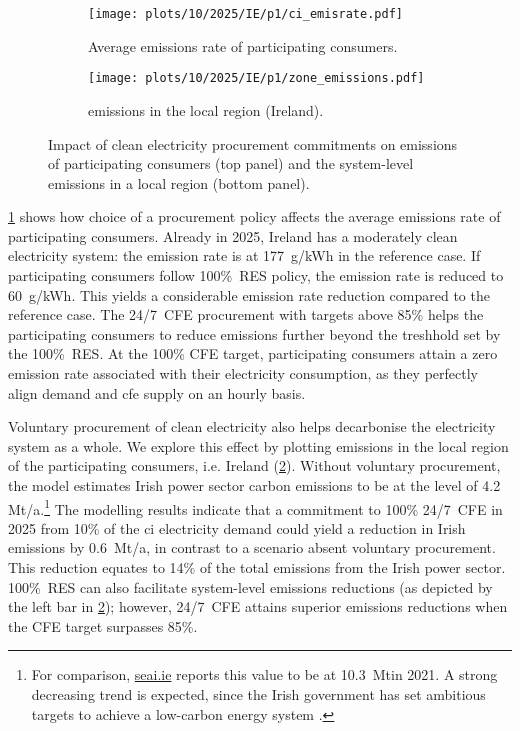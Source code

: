 \begin{figure}[t]
    \centering
    \begin{subfigure}[t]{0.95\columnwidth}
        \centering
        \caption{Average emissions rate of participating consumers.}
        \texttt{[image: plots/10/2025/IE/p1/ci\_emisrate.pdf]}
        \label{fig:10-2025-IE-p1-ci_emisrate}
    \end{subfigure}
    \begin{subfigure}[t]{0.95\columnwidth}
        \centering
        \vspace{-0.2cm}
        \caption{\co emissions in the local region (Ireland).}
        \texttt{[image: plots/10/2025/IE/p1/zone\_emissions.pdf]}
        \label{fig:10-2025-IE-p1-zone_emissions}
    \end{subfigure}
    \caption{Impact of clean electricity procurement commitments on emissions of participating consumers (top panel) and the system-level emissions in a local region (bottom panel).}
    \label{fig:10-2025-IE-p1-emissions}
\end{figure}

\cref{fig:10-2025-IE-p1-ci_emisrate} shows how choice of a procurement policy affects the average emissions rate of participating consumers.
Already in 2025, Ireland has a moderately clean electricity system: the emission rate is at 177~g\co/kWh in the reference case.
If participating consumers follow 100\%~RES policy, the emission rate is reduced to 60~g\co/kWh.
This yields a considerable emission rate reduction compared to the reference case.
The 24/7~CFE procurement with targets above 85\% helps the participating consumers to reduce emissions further beyond the treshhold set by the 100\%~RES. 
At the 100\% CFE target, participating consumers attain a zero emission rate associated with their electricity consumption, as they perfectly align demand and \gls{cfe} supply on an hourly basis.

Voluntary procurement of clean electricity also helps decarbonise the electricity system as a whole.
We explore this effect by plotting \co emissions in the local region of the participating consumers, i.e. Ireland (\cref{fig:10-2025-IE-p1-zone_emissions}).
Without voluntary procurement, the model estimates Irish power sector carbon emissions to be at the level of 4.2 Mt\co/a.\footnote{For comparison, \href{https://www.seai.ie/data-and-insights/seai-statistics/key-publications/co2-emissions-report/}{seai.ie} reports this value to be at 10.3~Mt\co in 2021. A strong decreasing trend is expected, since the Irish government has set ambitious targets to achieve a low-carbon energy system \cite{seaiCOEmissionsReport2020}.}
The modelling results indicate that a commitment to 100\% 24/7~CFE in 2025 from 10\% of the \gls{ci} electricity demand could yield a reduction in Irish emissions by 0.6~Mt\co/a, in contrast to a scenario absent voluntary procurement. 
This reduction equates to 14\% of the total emissions from the Irish power sector.
100\%~RES can also facilitate system-level \co emissions reductions (as depicted by the left bar in \cref{fig:10-2025-IE-p1-zone_emissions}); however, 24/7~CFE attains superior emissions reductions when the CFE target surpasses 85\%.


